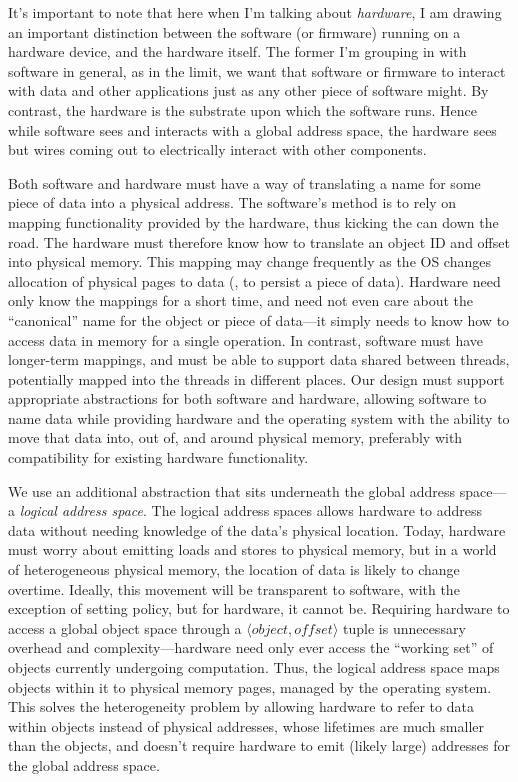 It's important to note that here when I'm talking about \emph{hardware}, I am drawing an important distinction between
the software (or firmware) running on a hardware device, and the hardware itself. The former I'm grouping in with
software in general, as in the limit, we want that software or firmware to interact with data and other applications
just as any other piece of software might. By contrast, the hardware is the substrate upon which the software runs.
Hence while software sees and interacts with a global address space, the hardware sees but wires coming out to
electrically interact with other components.


Both software and hardware must have a way of translating a
name for some piece of data into a physical address. The software's method is to rely on mapping functionality provided
by the hardware, thus kicking the can down the road. The hardware must therefore know how to translate an object ID and
offset into physical memory.
This mapping may change frequently as the OS changes allocation of physical
pages to data (\eg, to persist a piece of data).
Hardware need only know
the mappings for a short time, and need not even care about the ``canonical''
name for the object or piece of data---it simply needs to know
how to access data in memory
for a single operation. In contrast, software must have longer-term mappings, and must
be able to support data shared between threads, potentially mapped into the threads
in different places.
Our design must support appropriate abstractions for both software and hardware,
allowing software to name data while providing hardware and
the operating system with the ability to move that data into, out of, and around physical memory, preferably with
compatibility for
existing hardware functionality.

We use an additional abstraction that sits underneath the global address space---a \emph{logical address space}. The
logical address spaces allows hardware to address data without needing knowledge of the data's physical location. Today,
hardware must worry about emitting loads and stores to physical memory, but in a world of heterogeneous physical memory,
the location of data is likely to change overtime. Ideally, this movement will be transparent to software, with the
exception of setting policy, but for hardware, it cannot be. Requiring hardware to access a global object space through a $\langle \mathit{object},
    \mathit{offset} \rangle$ tuple is unnecessary overhead and complexity---hardware need only ever
access the ``working set'' of objects currently undergoing computation. Thus, the logical address space
maps objects within it to physical memory pages, managed by the
operating system. This solves the heterogeneity problem by allowing hardware to refer to data within
objects instead of physical addresses, whose lifetimes are much smaller than the objects, and
doesn't require hardware to emit (likely large) addresses for the global address space.

